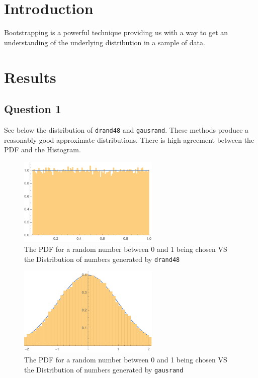 \documentclass{article}
\author{\hwauthor}
\title{\hwtitle}
\date{\hwdate}
\begin{document}
\maketitle
\thispagestyle{fancy}

\section{Introduction}
 
 Bootstrapping is a powerful technique providing us with a way to get an understanding of the underlying distribution in a sample of data.

\section{Results}

\subsection{Question 1}

See below the distribution of \texttt{drand48} and \texttt{gausrand}. These methods produce a reasonably good approximate distributions. There is high agreement between the PDF and the Histogram.

\begin{figure}[!htb]
	\begin{center}
		\includegraphics[width=0.6\textwidth]{p1a.pdf}
	\end{center}
	\caption{The PDF for a random number between 0 and 1 being chosen VS the Distribution of numbers generated by \texttt{drand48}}
\label{fig:qual}
\end{figure}
\FloatBarrier

\begin{figure}[!htb]
	\begin{center}
		\includegraphics[width=0.6\textwidth]{p1b.pdf}
	\end{center}
	\caption{The PDF for a random number between 0 and 1 being chosen VS the Distribution of numbers generated by \texttt{gausrand}}
\label{fig:qual}
\end{figure}
\FloatBarrier
\end{document}
